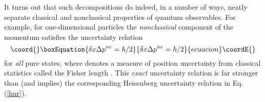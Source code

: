 \documentclass[a4paper,preprint, showpacs, aps, draft]{revtex4}
\begin{document}
It turns out that
such decompositions do indeed, in a number of ways, 
neatly separate classical and
nonclassical properties of quantum observables.  
For example, for one-dimensional particles the {\it
nonclassical} component of the momentum satisfies the uncertainty
relation 
\begin{equation}\coord{}\boxEquation{ \label{eur}
\delta x \Delta p^{nc} = \hbar/2
}{ \delta x \Delta p^{nc} = \hbar/2
}{ecuacion}\coordE{}\end{equation}
for {\it all} pure states, where \coordHE{} denotes 
a measure of position uncertainty from
classical statistics called the Fisher length \cite{eur, hallfish}.
This {\it exact} uncertainty relation is far stronger than
(and implies) the corresponding Heisenberg uncertainty relation in Eq.
(\ref{hur}). 
\end{document}
